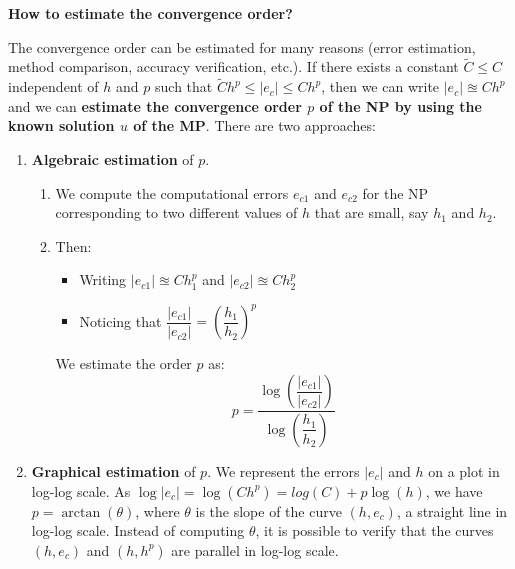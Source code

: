 \highspace
\begin{flushleft}
    \textcolor{Green3}{ \textbf{How to estimate the convergence order?}}
\end{flushleft}
The convergence order can be estimated for many reasons (error estimation, method comparison, accuracy verification, etc.). If there exists a constant $\tilde{C} \le C$ independent of $h$ and $p$ such that $\tilde{C}h^{p} \le \left|e_{c}\right| \le C h^{p}$, then we can write $\left|e_{c}\right| \approxeq Ch^{p}$ and we can \textbf{estimate the convergence order $p$ of the NP by using the known solution $u$ of the MP}. There are two approaches:
\begin{enumerate}
    \item \textbf{Algebraic estimation} of $p$.
    \begin{enumerate}
        \item We compute the computational errors $e_{c1}$ and $e_{c2}$ for the NP corresponding to two different values of $h$ that are  small, say $h_{1}$ and $h_{2}$.
        \item Then:
        \begin{itemize}
            \item Writing $\left|e_{c1}\right| \approxeq Ch_{1}^{p}$ and $\left|e_{c2}\right| \approxeq Ch_{2}^{p}$
            \item Noticing that $\dfrac{\left|e_{c1}\right|}{\left|e_{c2}\right|} = \left(\dfrac{h_{1}}{h_{2}}\right)^{p}$
        \end{itemize}
        We estimate the order $p$ as:
        \begin{equation}
            p = \dfrac{
                \log\left(\dfrac{\left|e_{c1}\right|}{\left|e_{c2}\right|}\right)
            }{
                \log\left(\dfrac{h_{1}}{h_{2}}\right)
            }
        \end{equation}
    \end{enumerate}
    
    \item \textbf{Graphical estimation} of $p$. We represent the errors $\left|e_{c}\right|$ and $h$ on a plot in log-log scale. As $\log\left|e_{c}\right| = \log\left(Ch^{p}\right) = log\left(C\right) + p \log\left(h\right)$, we have $p = \arctan\left(\theta\right)$, where $\theta$ is the slope of the curve $\left(h, e_{c}\right)$, a straight line in log-log scale. Instead of computing $\theta$, it is possible to verify that the curves $\left(h, e_{c}\right)$ and $\left(h, h^{p}\right)$ are parallel in log-log scale.


\end{enumerate}
